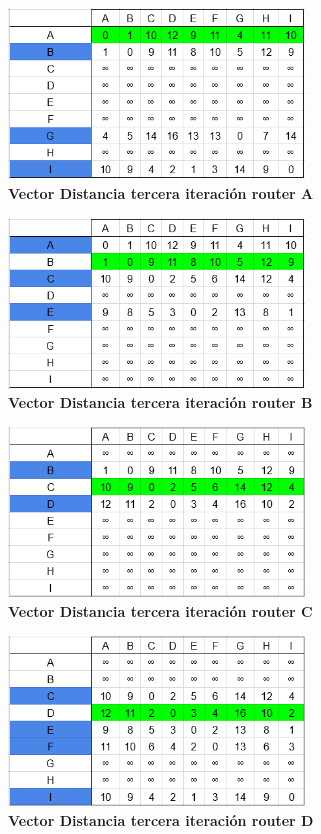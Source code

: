 \documentclass[12pt]{article}
\begin{document}
\begin{figure}[H] 
\centering 
\includegraphics[width=0.7\textwidth]{imagenes/3A3.png} \caption{\small \textbf{Vector Distancia tercera iteración router A}}
\label{fig:diagrama_73} 
\end{figure}
\begin{figure}[H] 
\centering 
\includegraphics[width=0.7\textwidth]{imagenes/3B3.png} \caption{\small \textbf{Vector Distancia tercera iteración router B}}
\label{fig:diagrama_74} 
\end{figure}
\begin{figure}[H] 
\centering 
\includegraphics[width=0.7\textwidth]{imagenes/3C3.png} \caption{\small \textbf{Vector Distancia tercera iteración router C}}
\label{fig:diagrama_75} 
\end{figure}
\begin{figure}[H] 
\centering 
\includegraphics[width=0.7\textwidth]{imagenes/3D3.png} \caption{\small \textbf{Vector Distancia tercera iteración router D}}
\label{fig:diagrama_76} 
\end{figure}
\end{document}
